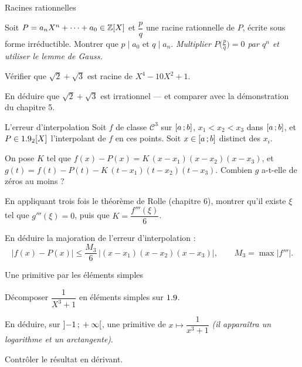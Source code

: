 \begin{exercice}[3]{Racines rationnelles}
\begin{questions}
  \item Soit $P=a_nX^{n}+\dots+a_0\in\mathbb{Z}[X]$ et $\dfrac{p}{q}$ une racine
    rationnelle de $P$, écrite sous forme irréductible. Montrer que
    $p\mid a_0$ et $q\mid a_n$.
    \emph{Multiplier $P\bigl(\frac pq\bigr)=0$ par $q^{n}$ et utiliser le
    lemme de Gauss.}
  \item Vérifier que $\sqrt2+\sqrt3$ est racine de $X^{4}-10X^{2}+1$.
  \item En déduire que $\sqrt2+\sqrt3$ est irrationnel — et comparer avec
    la démonstration du chapitre 5.
\end{questions}
\end{exercice}

\begin{exercice}[3]{L'erreur d'interpolation}
Soit $f$ de classe $\mathscr{C}^{3}$ sur $\mathopen{[}a\,{;}\,b\mathclose{]}$,
$x_1<x_2<x_3$ dans $\mathopen{[}a\,{;}\,b\mathclose{]}$, et $P\in1.9_2[X]$ l'interpolant de $f$
en ces points. Soit $x\in\mathopen{[}a\,{;}\,b\mathclose{]}$ distinct des $x_i$.
\begin{questions}
  \item On pose $K$ tel que
    $f(x)-P(x)=K\,(x-x_1)(x-x_2)(x-x_3)$, et
    $g(t)=f(t)-P(t)-K\,(t-x_1)(t-x_2)(t-x_3)$. Combien $g$ a-t-elle de
    zéros au moins ?
  \item En appliquant trois fois le théorème de Rolle (chapitre 6),
    montrer qu'il existe $\xi$ tel que $g'''(\xi)=0$, puis que
    $K=\dfrac{f'''(\xi)}{6}$.
  \item En déduire la majoration de l'erreur d'interpolation :
    \[
      |f(x)-P(x)|\leq\frac{M_3}{6}\,
      \bigl|(x-x_1)(x-x_2)(x-x_3)\bigr|,
      \qquad M_3=\max|f'''|.
    \]
\end{questions}
\end{exercice}

\begin{exercice}[3]{Une primitive par les éléments simples}
\begin{questions}
  \item Décomposer $\dfrac{1}{X^{3}+1}$ en éléments simples sur $1.9$.
  \item En déduire, sur $\mathopen{]}-1\,{;}\,+\infty\mathclose{[}$, une primitive de
    $x\mapsto\dfrac{1}{x^{3}+1}$ \emph{(il apparaîtra un logarithme et un
    arctangente)}.
  \item Contrôler le résultat en dérivant.
\end{questions}
\end{exercice}

